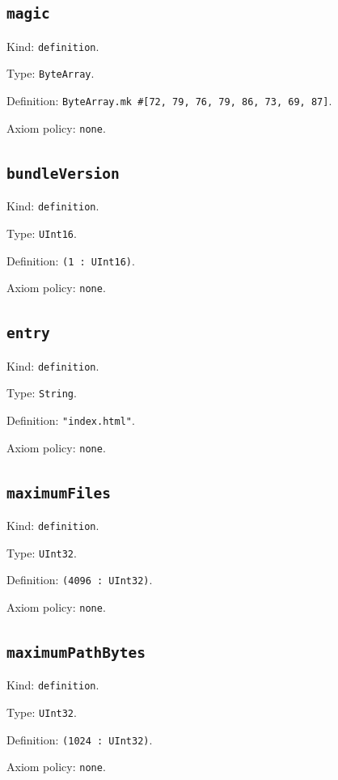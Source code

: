 \documentclass[11pt]{article}
\begin{document}
\subsection*{\texttt{magic}}
\noindent Kind: \texttt{definition}.\par
\noindent Type: \texttt{ByteArray}.\par
\noindent Definition: \texttt{ByteArray.mk \#[72, 79, 76, 79, 86, 73, 69, 87]}.\par
\noindent Axiom policy: \texttt{none}.\par
\subsection*{\texttt{bundleVersion}}
\noindent Kind: \texttt{definition}.\par
\noindent Type: \texttt{UInt16}.\par
\noindent Definition: \texttt{(1 : UInt16)}.\par
\noindent Axiom policy: \texttt{none}.\par
\subsection*{\texttt{entry}}
\noindent Kind: \texttt{definition}.\par
\noindent Type: \texttt{String}.\par
\noindent Definition: \texttt{"index.html"}.\par
\noindent Axiom policy: \texttt{none}.\par
\subsection*{\texttt{maximumFiles}}
\noindent Kind: \texttt{definition}.\par
\noindent Type: \texttt{UInt32}.\par
\noindent Definition: \texttt{(4096 : UInt32)}.\par
\noindent Axiom policy: \texttt{none}.\par
\subsection*{\texttt{maximumPathBytes}}
\noindent Kind: \texttt{definition}.\par
\noindent Type: \texttt{UInt32}.\par
\noindent Definition: \texttt{(1024 : UInt32)}.\par
\noindent Axiom policy: \texttt{none}.\par
\end{document}
